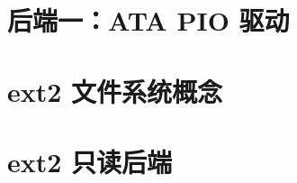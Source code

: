 
\section{后端一：ATA PIO 驱动}
\label{sec:diskfs-ata}


\section{ext2 文件系统概念}
\label{sec:diskfs-ext2-concept}


\section{ext2 只读后端}
\label{sec:diskfs-ext2-ro}

